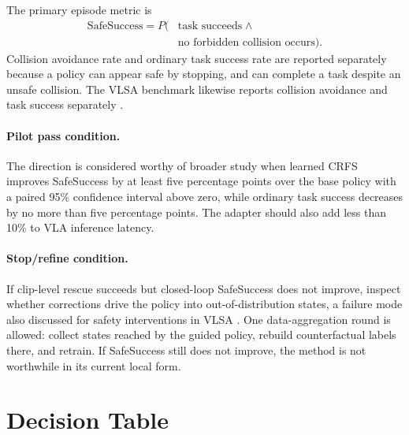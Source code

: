 \documentclass[10pt,conference]{IEEEtran}
\newcommand{\method}{\textsc{CRFS}}
\newcommand{\1}{\mathbf{1}}
\begin{document}
The primary episode metric is
\begin{equation}
\begin{aligned}
\mathrm{SafeSuccess}=P(&\text{task succeeds}\;\land\;\\
&\text{no forbidden collision occurs}).
\end{aligned}
\label{eq:safesuccess}
\end{equation}
Collision avoidance rate and ordinary task success rate are reported separately because a policy can appear safe by stopping, and can complete a task despite an unsafe collision. The VLSA benchmark likewise reports collision avoidance and task success separately \cite{hu2025vlsa}.

\paragraph{Pilot pass condition.}
The direction is considered worthy of broader study when learned \method{} improves SafeSuccess by at least five percentage points over the base policy with a paired 95\% confidence interval above zero, while ordinary task success decreases by no more than five percentage points. The adapter should also add less than 10\% to VLA inference latency.

\paragraph{Stop/refine condition.}
If clip-level rescue succeeds but closed-loop SafeSuccess does not improve, inspect whether corrections drive the policy into out-of-distribution states, a failure mode also discussed for safety interventions in VLSA \cite{hu2025vlsa}. One data-aggregation round is allowed: collect states reached by the guided policy, rebuild counterfactual labels there, and retrain. If SafeSuccess still does not improve, the method is not worthwhile in its current local form.

\section{Decision Table}
\end{document}
